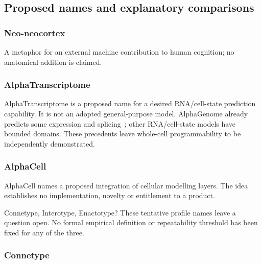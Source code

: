 \subsection*{Proposed names and explanatory comparisons}


\subsubsection*{Neo-neocortex}

\noindent A metaphor for an external machine contribution to human cognition; no anatomical addition is claimed.\par


\subsubsection*{AlphaTranscriptome}

\noindent AlphaTranscriptome is a proposed name for a desired RNA/cell-state prediction capability. It is not an adopted general-purpose model. AlphaGenome already predicts some expression and splicing~\citep{alphagenomeRetained}; other RNA/cell-state models have bounded domains. These precedents leave whole-cell programmability to be independently demonstrated.\par


\subsubsection*{AlphaCell}

\noindent AlphaCell names a proposed integration of cellular modelling layers. The idea establishes no implementation, novelty or entitlement to a product.\par

\noindent Connetype, Interotype, Enactotype? These tentative profile names leave a question open. No formal empirical definition or repeatability threshold has been fixed for any of the three.\par


\subsubsection*{Connetype}

